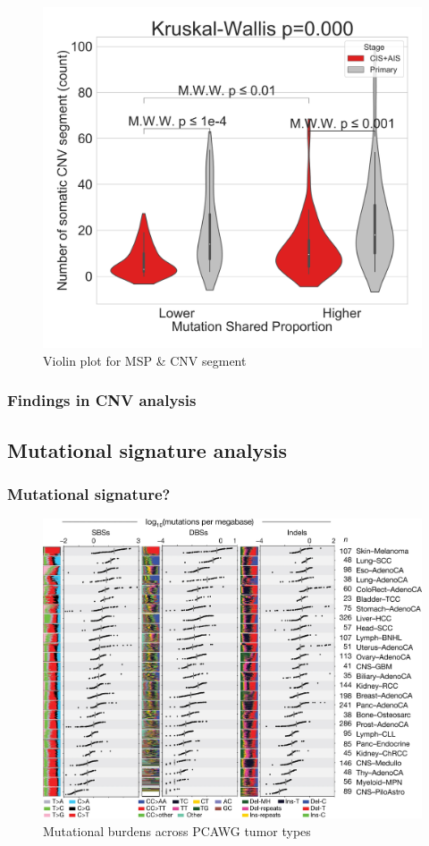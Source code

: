 \documentclass{beamer}
\begin{document}
\begin{frame}[allowframebreaks]
                    \begin{figure}
                        \includegraphics[width=0.4 \linewidth]{figures/MutationSharedProportion_CNV/Segment/Segment.BWA.Sequenza.SQC.median/Violin_Mutation Shared Proportion.pdf}
                        \caption{Violin plot for MSP \& CNV segment}
                    \end{figure}
                \end{frame}

            \begin{frame}
                \frametitle{Findings in CNV analysis}
            \end{frame}

        \subsection{Mutational signature analysis}
            \begin{frame}
                \frametitle{Mutational signature?}

                \begin{figure}
                    \includegraphics[width=0.6 \linewidth]{figures/LungCancer/signatures.jpg}
                    \caption{Mutational burdens across PCAWG tumor types }
                \end{figure}
            \end{frame}
\end{document}
